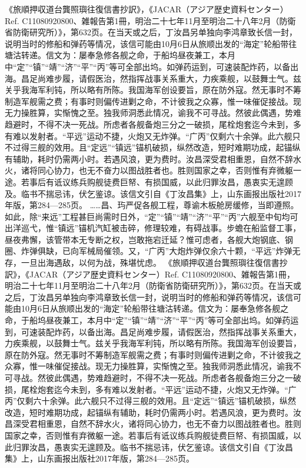 \documentclass[12pt,UTF8]{ctexbook}
\begin{document}
《旅順押収道台龔照璵往復信書抄訳》，《JACAR（アジア歴史資料センター）Ref. C11080920800、雑報告第1冊，明治二十七年11月至明治二十八年2月（防衛省防衛研究所）》，第632页。在当天或之后，丁汝昌另单独向李鸿章致长信一封，说明当时的修船和弹药等情况，该信可能由10月6日从旅顺出发的“海定”轮船带往塘沽转递。信文为：屡奉急修各舰之命，于船坞昼夜兼工，本月中“定”“镇”“靖”“济”“平”“丙”等可全部出坞。如弹药运到，可速装配炸药，以备出海。昌足尚难步履，请假医治，然指挥战事关系重大，力疾乘舰，以鼓舞士气。兹关乎我海军利钝，所以略有所陈。我国海军创设要旨，原在防外寇。然无事时不筹制造军舰需之费；有事时则偏传进剿之命，不计彼我之众寡，惟一味催促接战。现无力操胜算，实惭愧之至。独我师洞悉此情况，谕我不可寻战。然彼此偶遇，势难趋避时，不得不决一死战。所虑者各舰备炮三分之一破损，尾栓炮套迄今未到，多有难以发射者。“平远”运动不捷，火炮又无炸弹。“广丙”仅剩六十余弹。此六舰只不过得三舰的效用。且“定远”“镇远”锚机破损，纵然改造，短时难期功成，起锚纵有辅助，耗时仍需两小时。若遇风浪，更为费时。汝昌深受君相重恩，自然不辞水火，诸将同心协力，也无不奋力以图战胜者也。胜则国家之幸，否则惟有弃微躯一途。若事后有诋议练兵购舰徒费巨帑、有损国威，以此归罪汝昌，愚衷实无遑顾及。临书不揣忌讳，伏乞鉴谅。该信文引自《丁汝昌集》上，山东画报出版社2017年版，第284—285页。
……昌、玙严促各舰工程，尊谕木板舱房缓修，当即遵照。如此，除“来远”工程甚巨尚需时日外，“定”“镇”“靖”“济”“平”“丙”六舰至中旬均可出洋巡弋，惟“镇远”锚机汽缸被击碎，修理较难，有碍战事。步蟾在船监督工事，昼夜弗懈，该管带本无专断之权，岂敢拖宕迁延？惟可虑者，各舰大炮钢底、钢圈、炸弹俱缺，已向军械局催领。又，“广丙”大炮炸弹仅余六十颗，“平远”炸弹无存，一旦出海遇敌，以何为战，殊堪忧虑。 《旅順押収道台龔照璵往復信書抄訳》，《JACAR（アジア歴史資料センター）Ref. C11080920800、雑報告第1冊，明治二十七年11月至明治二十八年2月（防衛省防衛研究所）》，第632页。在当天或之后，丁汝昌另单独向李鸿章致长信一封，说明当时的修船和弹药等情况，该信可能由10月6日从旅顺出发的“海定”轮船带往塘沽转递。信文为：屡奉急修各舰之命，于船坞昼夜兼工，本月中“定”“镇”“靖”“济”“平”“丙”等可全部出坞。如弹药运到，可速装配炸药，以备出海。昌足尚难步履，请假医治，然指挥战事关系重大，力疾乘舰，以鼓舞士气。兹关乎我海军利钝，所以略有所陈。我国海军创设要旨，原在防外寇。然无事时不筹制造军舰需之费；有事时则偏传进剿之命，不计彼我之众寡，惟一味催促接战。现无力操胜算，实惭愧之至。独我师洞悉此情况，谕我不可寻战。然彼此偶遇，势难趋避时，不得不决一死战。所虑者各舰备炮三分之一破损，尾栓炮套迄今未到，多有难以发射者。“平远”运动不捷，火炮又无炸弹。“广丙”仅剩六十余弹。此六舰只不过得三舰的效用。且“定远”“镇远”锚机破损，纵然改造，短时难期功成，起锚纵有辅助，耗时仍需两小时。若遇风浪，更为费时。汝昌深受君相重恩，自然不辞水火，诸将同心协力，也无不奋力以图战胜者也。胜则国家之幸，否则惟有弃微躯一途。若事后有诋议练兵购舰徒费巨帑、有损国威，以此归罪汝昌，愚衷实无遑顾及。临书不揣忌讳，伏乞鉴谅。该信文引自《丁汝昌集》上，山东画报出版社2017年版，第284—285页。
\end{document}
